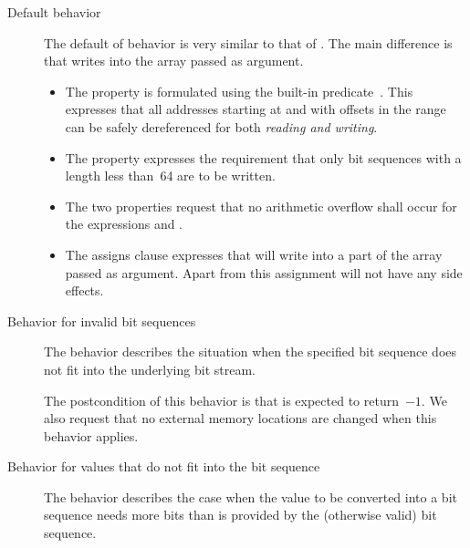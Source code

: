 \begin{description}
\item[Default behavior]
The default of \poke behavior is very similar to that of \peek.
The main difference is that \poke writes into the array passed as argument.

\begin{itemize}
\item
The property  is formulated using
the built-in \acsl predicate~\inl{\\valid}.
This expresses that all addresses starting at 
and with offsets in the range~
can be safely dereferenced for both \emph{reading and writing}.

\item
The property  expresses the requirement that only
bit sequences with a length less than~64 are to be written.

\item
The two  properties request that no arithmetic overflow
shall occur for the expressions  and
.

\item
The assigns clause expresses that \poke will 
write into a part of the array passed as argument.
Apart from this assignment \poke will not have any side effects.
      
\end{itemize}

\item[Behavior for invalid bit sequences]

The behavior  describes the situation when
the specified bit sequence does not fit into the underlying bit stream.

The postcondition of this behavior is that \poke is expected to return~$-1$.
We also request that no external memory locations are changed when this
behavior applies.


\item[Behavior for values that do not fit into the bit sequence]

The behavior  describes the case when the
value to be converted into a bit sequence needs more bits than
is provided by the (otherwise valid) bit sequence.


\end{description}
